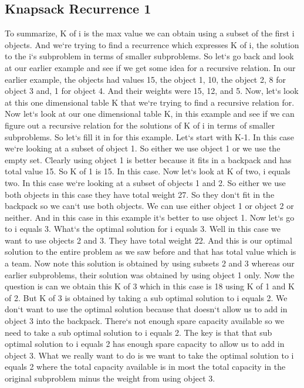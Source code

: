 \subsection{Knapsack  Recurrence 1}
To summarize, K of i is the max value we can obtain using a subset of the first i objects.
And we`re trying to find a recurrence which expresses K of i, the solution to the i`s subproblem in terms of smaller subproblems.
So let`s go back and look at our earlier example and see if we get some idea for a recursive relation.
In our earlier example, the objects had values 15, the object 1, 10, the object 2, 8 for object 3 and, 1 for object 4.
And their weights were 15, 12, and 5.
Now, let`s look at this one dimensional table K that we`re trying to find a recursive relation for.
Now let`s look at our one dimensional table K, in this example and see if we can figure out a recursive relation for the solutions of K of i in terms of smaller subproblems.
So let`s fill it in for this example.
Let`s start with K-1.
In this case we`re looking at a subset of object 1.
So either we use object 1 or we use the empty set.
Clearly using object 1 is better because it fits in a backpack and has total value 15.
So K of 1 is 15.
In this case.
Now let`s look at K of two, i equals two.
In this case we`re looking at a subset of objects 1 and 2.
So either we use both objects in this case they have total weight 27.
So they don`t fit in the backpack so we can`t use both objects.
We can use either object 1 or object 2 or neither.
And in this case in this example it`s better to use object 1.
Now let`s go to i equals 3.
What`s the optimal solution for i equals 3.
Well in this case we want to use objects 2 and 3.
They have total weight 22.
And this is our optimal solution to the entire problem as we saw before and that has total value which is a team.
Now note this solution is obtained by using subsets 2 and 3 whereas our earlier subproblems, their solution was obtained by using object 1 only.
Now the question is can we obtain this K of 3 which in this case is 18 using K of 1 and K of 2.
But K of 3 is obtained by taking a sub optimal solution to i equals 2.
We don`t want to use the optimal solution because that doesn`t allow us to add in object 3 into the backpack.
There`s not enough spare capacity available so we need to take a sub optimal solution to i equals 2.
The key is that that sub optimal solution to i equals 2 has enough spare capacity to allow us to add in object 3.
What we really want to do is we want to take the optimal solution to i equals 2 where the total capacity available is in most the total capacity in the original subproblem minus the weight from using object 3.
